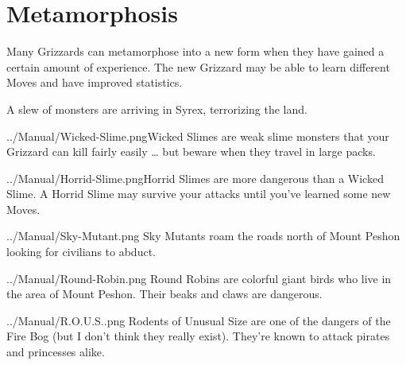 \documentclass[10pt,twocolumn,openany,article]{memoir}
\begin{document}
\section{Metamorphosis}

Many Grizzards  can metamorphose into a  new form when they  have gained
a certain  amount of experience. The  new Grizzard may be  able to learn
different Moves and have improved statistics.


A slew of monsters are arriving in Syrex, terrorizing the land.

\vspace{14pt}

\lettrine[image=true,                lines=5,               findent=3pt,
nindent=3pt]{../Manual/Wicked-Slime.png}{}Wicked  Slimes are  weak slime
monsters that  your Grizzard can  kill fairly  easily … but  beware when
they travel in large packs.

\vspace{14pt}

\lettrine[image=true,                lines=5,               findent=3pt,
nindent=3pt]{../Manual/Horrid-Slime.png}{}Horrid   Slimes   are    more
dangerous than a  Wicked Slime. A Horrid Slime may  survive your attacks
until you've learned some new Moves.

\vspace{14pt}

\lettrine[image=true,                lines=5,               findent=3pt,
nindent=3pt]{../Manual/Sky-Mutant.png}{} Sky Mutants roam the roads north
of Mount Peshon  looking for civilians to abduct.

\vspace{14pt}

\lettrine[image=true,                lines=5,               findent=3pt,
nindent=3pt]{../Manual/Round-Robin.png}{} Round Robins are colorful giant
birds who live  in the area of  Mount Peshon. Their beaks  and claws are
dangerous.

\ifdefined\ATARIAGESAVE\pagebreak\else
\vspace{14pt}
\fi

\lettrine[image=true,                lines=5,               findent=3pt,
nindent=3pt]{../Manual/R.O.U.S..png}{} Rodents of Unusual Size are one of
the  dangers of  the Fire  Bog (but  I don't  think they  really exist).
They're known to attack pirates and princesses alike.
\end{document}
